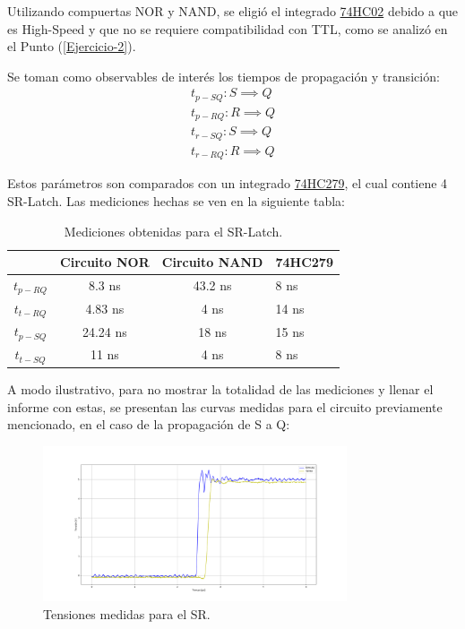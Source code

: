 Utilizando compuertas NOR y NAND, se eligió el integrado \href{https://pdf1.alldatasheet.com/datasheet-pdf/view/228632/ONSEMI/74HC02.html}{74HC02} debido a que es High-Speed y que no se requiere compatibilidad con TTL, como se analizó en el Punto (\ref{Ejercicio-2}). 

Se toman como observables de interés los tiempos de propagación y transición:
\begin{equation*}
\begin{split}
	t_{p-SQ}: S \implies Q \\
	t_{p-RQ}: R \implies Q \\
	t_{r-SQ}: S \implies Q \\
	t_{r-RQ}: R \implies Q
\end{split}
\end{equation*}

Estos parámetros son comparados con un integrado \href{http://noel.feld.cvut.cz/hw/st/1937.pdf}{74HC279}, el cual contiene 4 SR-Latch. Las mediciones hechas se ven en la siguiente tabla:
\begin{table}[H]
\centering
\begin{tabular}{cccl}
\hline
\textit{}           & \textbf{Circuito NOR} & \textbf{Circuito NAND} & \textbf{74HC279} \\ \hline
\textbf{$t_{p-RQ}$} & 8.3 ns                 & 43.2 ns                 & 8 ns              \\
\textbf{$t_{t-RQ}$} & 4.83 ns                & 4 ns                    & 14 ns             \\
\textbf{$t_{p-SQ}$} & 24.24 ns               & 18 ns                   & 15 ns             \\
\textbf{$t_{t-SQ}$} & 11 ns                  & 4 ns                    & 8 ns             \\
\hline
\end{tabular}
\caption{Mediciones obtenidas para el SR-Latch.}
\label{tab:srl}
\end{table}

A modo ilustrativo, para no mostrar la totalidad de las mediciones y llenar el informe con estas, se presentan las curvas medidas para el circuito previamente mencionado, en el caso de la propagación de S a Q:
\begin{figure}[H]	
	\centering
	\includegraphics[width=0.8\textwidth]{ImagenesEjercicio6/Medicion-SR.png}
	\caption{Tensiones medidas para el SR.}
	\label{fig:medsr}
\end{figure}

